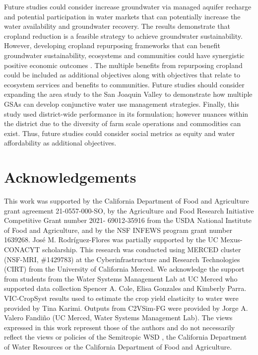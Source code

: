 \documentclass[a4paper,fleqn]{cas-sc}
\begin{document}
Future studies could consider increase groundwater via managed aquifer recharge \citep{alam_can_2020} and potential participation in water markets \citep{arellano-gonzalez_adaptive_2021,hanak_water_2019} that can potentially increase the water availability and groundwater recovery. The results demonstrate that cropland reduction is a feasible strategy to achieve groundwater sustainability. However, developing cropland repurposing frameworks that can benefit groundwater sustainability, ecosystems and communities could have synergistic positive economic outcomes \citep{biggs_landowner_2022,fernandez-bou_water_2023,espinoza_fallow_2023}. The multiple benefits from repurposing cropland could be included as additional objectives along with objectives that relate to ecosystem services and benefits to communities. Future studies should consider expanding the area study to the San Joaquin Valley to demonstrate how multiple GSAs can develop conjunctive water use management strategies. Finally, this study used district-wide performance in its formulation; however nuances within the district due to the diversity of farm scale operations and commodities can exist. Thus, future studies could consider social metrics as equity and water affordability as additional objectives.  

\section*{Acknowledgements}

This work was supported by the California Department of Food and Agriculture grant agreement 21-0557-000-SO, by the Agriculture and Food Research Initiative Competitive Grant number 2021- 69012-35916 from the USDA National Institute of Food and Agriculture, and by the NSF INFEWS program grant number 1639268. José M. Rodríguez-Flores was partially supported by the UC Mexus-CONACYT scholarship. This research was conducted using MERCED cluster (NSF-MRI, \#1429783) at the Cyberinfrastructure and Research Technologies (CIRT) from the University of California Merced. We acknowledge the support from students from the Water Systems Management Lab at UC Merced who supported data collection Spencer A. Cole, Elisa Gonzales and Kimberly Parra. VIC-CropSyst results used to estimate the crop yield elasticity to water were provided by Tina Karimi. Outputs from  C2VSim-FG were provided by Jorge A. Valero Fandiño (UC Merced, Water Systems Management Lab). The views expressed in this work represent those of the authors and do not necessarily reflect the views or policies of the Semitropic WSD , the California Department of Water Resources or the California Department of Food and Agriculture. 
\end{document}
